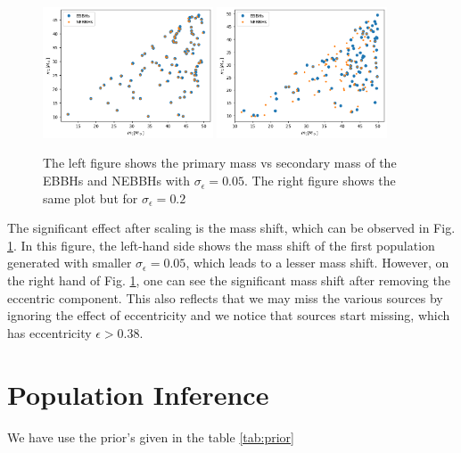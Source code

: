 \documentclass[twocolumn,prd,nofootinbib]{revtex4}
\begin{document}
\begin{figure}

\includegraphics[width=0.45\textwidth]{paper/figures/pop2d_0.05.png}
\includegraphics[width=0.45\textwidth]{paper/figures/pop2d_0.2.png}
\caption{\label{fig:pop2d_0.05_0.2} The left figure shows the primary mass vs secondary mass of the EBBHs and NEBBHs with $\sigma_\epsilon =0.05$. The right figure shows the same plot but for $\sigma_\epsilon=0.2$} 

\end{figure}

   


The significant effect after scaling is the mass shift, which can be observed in Fig. \ref{fig:pop2d_0.05_0.2}. In this figure, the left-hand side shows the mass shift of the first population generated with smaller $\sigma_\epsilon =0.05$, which leads to a lesser mass shift. However, on the right hand of Fig. \ref{fig:pop2d_0.05_0.2}, one can see the significant mass shift after removing the eccentric component.  This also reflects that we may miss the various sources by ignoring the effect of eccentricity and we notice that sources start missing, which has eccentricity $\epsilon>0.38$.


                            

\section{Population Inference}
\label{sec:pop_inference}
We have use the prior's given in the table \ref{tab:prior}
\end{document}
